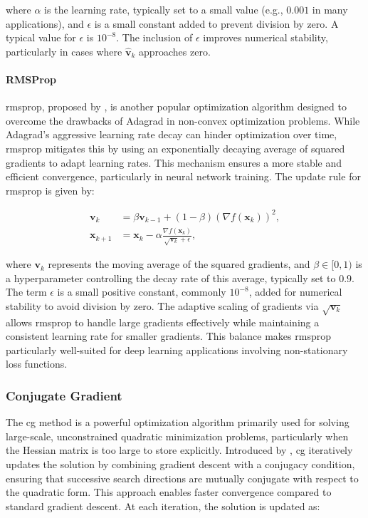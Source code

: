 \noindent where $\alpha$ is the learning rate, typically set to a small value (e.g., $0.001$ in many applications), and $\epsilon$ is a small constant added to prevent division by zero. A typical value for $\epsilon$ is $10^{-8}$. The inclusion of $\epsilon$ improves numerical stability, particularly in cases where $\hat{\mathbf{v}}_k$ approaches zero.

\paragraph{RMSProp}
\label{paragraph:rmsprop}
\ac{rmsprop}, proposed by \citet{tieleman2012lecture}, is another popular optimization algorithm designed to overcome the drawbacks of Adagrad in non-convex optimization problems. While Adagrad's aggressive learning rate decay can hinder optimization over time, \ac{rmsprop} mitigates this by using an exponentially decaying average of squared gradients to adapt learning rates. This mechanism ensures a more stable and efficient convergence, particularly in neural network training. The update rule for \ac{rmsprop} is given by:

\begin{align}
\mathbf{v}_k &= \beta \mathbf{v}_{k-1} + (1 - \beta) (\nabla f(\mathbf{x}_k))^2, \\
\mathbf{x}_{k+1} &= \mathbf{x}_k - \alpha \frac{\nabla f(\mathbf{x}_k)}{\sqrt{\mathbf{v}_k} + \epsilon},
\end{align}

\noindent where $\mathbf{v}_k$ represents the moving average of the squared gradients, and $\beta \in [0, 1)$ is a hyperparameter controlling the decay rate of this average, typically set to $0.9$. The term $\epsilon$ is a small positive constant, commonly $10^{-8}$, added for numerical stability to avoid division by zero. The adaptive scaling of gradients via $\sqrt{\mathbf{v}_k}$ allows \ac{rmsprop} to handle large gradients effectively while maintaining a consistent learning rate for smaller gradients. This balance makes \ac{rmsprop} particularly well-suited for deep learning applications involving non-stationary loss functions.


\subsubsection{Conjugate Gradient}
\label{subsubsection:conjugate_gradient}

The \ac{cg} method is a powerful optimization algorithm primarily used for solving large-scale, unconstrained quadratic minimization problems, particularly when the Hessian matrix is too large to store explicitly. Introduced by \citet{hestenes1952methods}, \ac{cg} iteratively updates the solution by combining gradient descent with a conjugacy condition, ensuring that successive search directions are mutually conjugate with respect to the quadratic form. This approach enables faster convergence compared to standard gradient descent. At each iteration, the solution is updated as:

